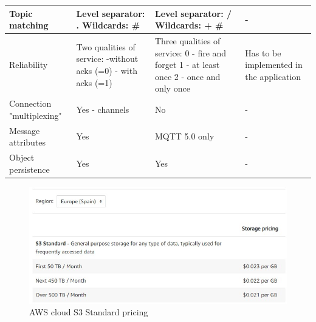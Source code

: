 \begin{table}[htbp]
\begin{center}
\begin{tabular}{|p{3cm}|p{4.5cm}|p{4.5cm}|p{4.5cm}|}
    \hline
    Topic matching & Level separator: . Wildcards: \* \# & Level separator: / Wildcards: + \# & - \\
    \hline
    Reliability & Two qualities of service: -without acks (=0) - with acks (=1) & Three qualities of service: 0 - fire and forget 1 - at least once 2 - once and only once & Has to be implemented in the application\\
    \hline
    Connection "multiplexing" & Yes - channels & No & -\\
    \hline
    Message attributes & Yes & MQTT 5.0 only & -\\
    \hline
    Object persistence & Yes & Yes & -\\
    \hline
    \end{tabular}
    \label{edge-cloud protocols}
    \end{center}
\end{table}
    
    
\begin{figure}[!ht]
    \centering
    \includegraphics[width=15cm]{functional_performance_specification/images/AWSpricing.jpg}
    \caption{AWS cloud S3 Standard pricing}
    \label{fig:AWS pricing}
\end{figure}
